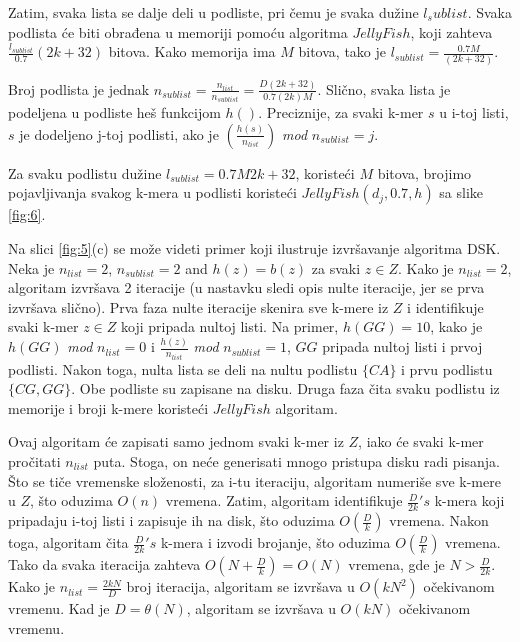\documentclass[12pt,oneside]{memoir}
\begin{document}
Zatim, svaka lista se dalje deli u podliste, pri čemu je svaka dužine $l_sublist$. Svaka podlista će biti obrađena u memoriji pomoću algoritma $JellyFish$, koji zahteva $\frac{l_{sublist}}{0.7}(2k +32)$ bitova. Kako memorija ima $M$ bitova, tako je $l_{sublist} = \frac{0.7M}{(2k + 32)}$.

Broj podlista je jednak $n_{sublist} = \frac{n_{list}}{n_{sublist}} = \frac{D(2k + 32)}{0.7(2k)M}$. Slično, svaka lista je podeljena u podliste heš funkcijom $h()$. Preciznije, za svaki k-mer $s$ u i-toj listi, $s$ je dodeljeno j-toj podlisti, ako je $(\frac{h(s)}{n_{list}})$ \textit{mod}
$n_{sublist} = j$.

Za svaku podlistu dužine $l_{sublist} = {0.7M}{2k + 32}$, koristeći $M$ bitova,  brojimo pojavljivanja svakog k-mera u podlisti koristeći $JellyFish(d_j, 0.7, h)$ sa slike \ref{fig:6}.

Na slici \ref{fig:5}(c) se može videti primer koji ilustruje izvršavanje algoritma DSK. Neka je $n_{list} = 2$, $n_{sublist} = 2$ and $h(z) = b(z)$ za svaki $z \in Z$. Kako je $n_{list} = 2$, algoritam izvršava 2 iteracije (u nastavku sledi opis nulte iteracije, jer se prva izvršava slično). Prva faza nulte iteracije skenira sve k-mere iz $Z$ i identifikuje svaki k-mer $z \in Z$ koji pripada nultoj listi. Na primer, $h(GG) = 10$, kako je $h(GG)$ \textit{mod} $n_{list} = 0$ i $\frac{h(z)}{n_{list}}$ \textit{mod} $n_{sublist} = 1$, $GG$ pripada nultoj listi i prvoj podlisti. Nakon toga, nulta lista se deli na nultu podlistu $\{CA\}$ i prvu podlistu $\{CG, GG\}$. Obe podliste su zapisane na disku. Druga faza čita svaku podlistu iz memorije i broji k-mere koristeći $JellyFish$ algoritam.

Ovaj algoritam će zapisati samo jednom svaki k-mer iz $Z$, iako će svaki k-mer pročitati $n_{list}$ puta. Stoga, on neće generisati mnogo pristupa disku radi pisanja. Što se tiče vremenske složenosti, za i-tu iteraciju, algoritam numeriše sve k-mere u $Z$, što oduzima $O(n)$ vremena. Zatim, algoritam identifikuje $\frac{D}{2k}'s$ k-mera koji pripadaju i-toj listi i zapisuje ih na disk, što oduzima $O(\frac{D}{k})$ vremena. Nakon toga, algoritam  čita $\frac{D}{2k}'s$ k-mera i izvodi brojanje, što oduzima $O(\frac{D}{k})$ vremena. Tako da svaka iteracija zahteva $O(N + \frac{D}{k}) = O(N)$ vremena, gde je $N > \frac{D}{2k}$. Kako je $n_{list} = \frac{2kN}{D}$ broj iteracija, algoritam se izvršava u $O(kN^2)$ očekivanom vremenu. Kad je $D = \theta(N)$, algoritam se izvršava u $O(kN)$ očekivanom vremenu.

\newpage
\end{document}
